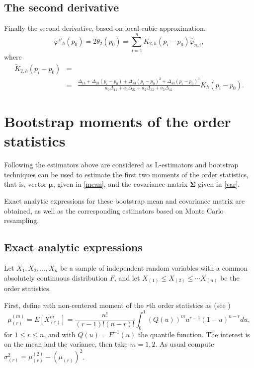 \documentclass[preprint,12pt]{elsarticle}
\begin{document}

\subsection{The second derivative}%
Finally the second derivative, based on local-cubic approximation.
\begin{equation}\label{d2phi.cub}
\widetilde{\varphi}''_h(p_0)= 2 \widetilde{\theta}_2(p_0)= \sum_{i=1}^n \widetilde{K}_{2,h}\left(p_i-p_0\right) \widehat{\varphi}_{n,i},
\end{equation}
where 
\begin{eqnarray*}
\widetilde{K}_{2,h}\left(p_i-p_0\right)&=&\\
&=& \frac{\Delta_{13}+\Delta_{23}\left(p_i-p_0 \right)+\Delta_{33}\left(p_i-p_0 \right)^2+\Delta_{43}\left(p_i-p_0 \right)^3}{a_0 \Delta_{11}+ a_1 \Delta_{21}+a_2 \Delta_{31}+a_3 \Delta_{41}} K_h\left(p_i-p_0\right).
\end{eqnarray*}



\section{Bootstrap moments of the order statistics} \label{apx:moments}

Following \cite{HE2000}  the estimators above are considered as L-estimators  and  bootstrap techniques can be used to estimate the first two moments of the order statistics, that is, vector $\boldsymbol{\mu}$, given in \eqref{mean}, and the covariance matrix $\boldsymbol{\Sigma}$ given in \eqref{var}. 


Exact analytic expressions for these bootstrap mean and covariance matrix are obtained, as well as the corresponding estimators based on Monte Carlo resampling. 

\subsection{Exact analytic expressions}

Let $X_1,X_2,\ldots, X_n$ be a sample of independent random variables with a common absolutely continuous distribution $F$, and let  $X_{(1)} \leq X_{(2)}\leq \cdots X_{(n)}$ be the order statistics. 

First,  define $m$th non-centered moment of the $r$th order statistics as (see \cite{ABN08})
\begin{equation}\label{mu.r}
\mu_{(r)}^{(m)}=E\left[X_{(r)}^m\right]=\frac{n!}{(r-1)!(n-r)!}\int_0^1(Q(u))^m u^{r-1}(1-u)^{n-r}du,
\end{equation}
for $1\leq r \leq n$, and with $Q(u)=F^{-1}(u)$ the quantile function. The interest is on the mean and the variance, then take $m=1,2$. As usual compute $\sigma_{(r)}^2=\mu_{(r)}^{(2)}-\left(\mu_{(r)}\right)^2$.  
\vskip 0.5cm
\end{document}
